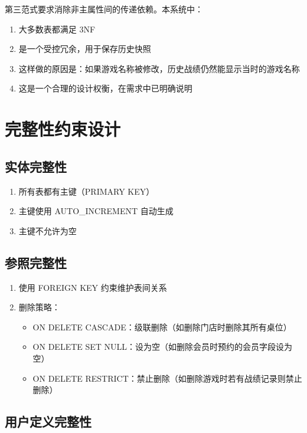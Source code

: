 第三范式要求消除非主属性间的传递依赖。本系统中：

\begin{enumerate}
  \item 大多数表都满足 3NF
  \item {} 是一个受控冗余，用于保存历史快照
  \item 这样做的原因是：如果游戏名称被修改，历史战绩仍然能显示当时的游戏名称
  \item 这是一个合理的设计权衡，在需求中已明确说明
\end{enumerate}

\section{完整性约束设计}

\subsection{实体完整性}

\begin{enumerate}
  \item 所有表都有主键（PRIMARY KEY）
  \item 主键使用 AUTO\_INCREMENT 自动生成
  \item 主键不允许为空
\end{enumerate}

\subsection{参照完整性}

\begin{enumerate}
  \item 使用 FOREIGN KEY 约束维护表间关系
  \item 删除策略：
    \begin{itemize}
      \item ON DELETE CASCADE：级联删除（如删除门店时删除其所有桌位）
      \item ON DELETE SET NULL：设为空（如删除会员时预约的会员字段设为空）
      \item ON DELETE RESTRICT：禁止删除（如删除游戏时若有战绩记录则禁止删除）
    \end{itemize}
\end{enumerate}

\subsection{用户定义完整性}

